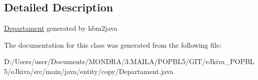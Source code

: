 \subsection{Detailed Description}
\mbox{\hyperlink{classentity_1_1copy_1_1_departament}{Departament}} generated by hbm2java 

The documentation for this class was generated from the following file\+:\begin{DoxyCompactItemize}
\item 
D\+:/\+Users/user/\+Documents/\+M\+O\+N\+D\+R\+A/3.\+M\+A\+I\+L\+A/\+P\+O\+P\+B\+L5/\+G\+I\+T/e\+Jkiva\+\_\+\+P\+O\+P\+B\+L5/e\+Jkiva/src/main/java/entity/copy/Departament.\+java\end{DoxyCompactItemize}
